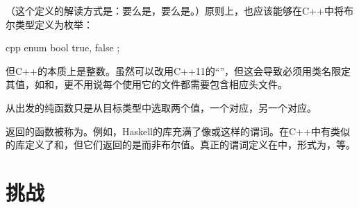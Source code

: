 （这个定义的解读方式是：要么是，要么是。）原则上，也应该能够在C++中将布尔类型定义为枚举：

\begin{snip}{cpp}
enum bool {
    true,
    false
};
\end{snip}
但C++的本质上是整数。虽然可以改用C++11的``''，但这会导致必须用类名限定其值，如和，更不用说每个使用它的文件都需要包含相应头文件。

从出发的纯函数只是从目标类型中选取两个值，一个对应，另一个对应。

返回的函数被称为。例如，Haskell的库充满了像或这样的谓词。在C++中有类似的库\code{}定义了和，但它们返回的是而非布尔值。真正的谓词定义在中，形式为，等。

\section{挑战}

